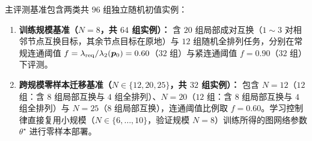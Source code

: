 主评测基准包含两类共 $96$ 组独立随机初值实例：
\begin{enumerate}
 \item \textbf{训练规模基准（$N=8$，共 $64$ 组实例）：} 含 $20$ 组局部成对互换（$1\sim 3$ 对相邻节点互换目标，其余节点目标在原地）与 $12$ 组随机全排列任务，分别在常规连通阈值 $f=\lambda_{\mathrm{req}}/\lambda_2(\boldsymbol{p}_0)=0.60$（$32$ 组）与紧连通阈值 $f=0.90$（$32$ 组）下评测。
 \item \textbf{跨规模零样本迁移基准（$N\in\{12,20,25\}$，共 $32$ 组实例）：} 包含 $N=12$（$12$ 组：含 $8$ 组局部互换与 $4$ 组全排列）、$N=20$（$12$ 组：含 $8$ 组局部互换与 $4$ 组全排列）与 $N=25$（$8$ 组局部互换），连通阈值比例取 $f=0.60$。学习控制律直接复用小规模（$N\in\{6,\dots,10\}$，验证规模 $N=8$）训练所得的图网络参数 $\theta^\star$ 进行零样本部署。
\end{enumerate}

